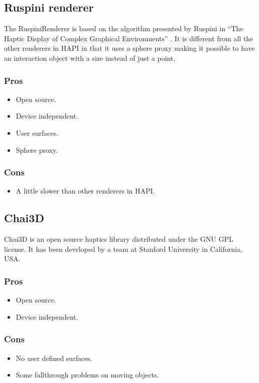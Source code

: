 \subsection{Ruspini renderer}
The RuspiniRenderer is based on the algorithm presented by Ruspini in
``The Haptic Display of Complex Graphical Environments'' \cite{ruspini}.
It is different from all the other renderers in HAPI in that it uses a
sphere proxy making it possible to have an interaction object with a size instead of just a point.  

\begin{minipage}[t]{3in}
\subsubsection{Pros}
\begin{itemize}
\item Open source.
\item Device independent.
\item User surfaces.
\item Sphere proxy.
\end{itemize}
\end{minipage}
\begin{minipage}[t]{3in}
\subsubsection{Cons}
\begin{itemize}
\item A little slower than other renderers in HAPI.
\end{itemize}
\end{minipage}

\subsection{Chai3D}
Chai3D \cite{chai3d} is an open source haptics library distributed under the GNU GPL license. It has been developed by a team at Stanford University in California, USA. 

\begin{minipage}[t]{3in}
\subsubsection{Pros}
\begin{itemize}
\item Open source.
\item Device independent.
\end{itemize}
\end{minipage}
\begin{minipage}[t]{3in}
\subsubsection{Cons}
\begin{itemize}
\item No user defined surfaces.
\item Some fallthrough problems on moving objects.
\end{itemize}
\end{minipage}

